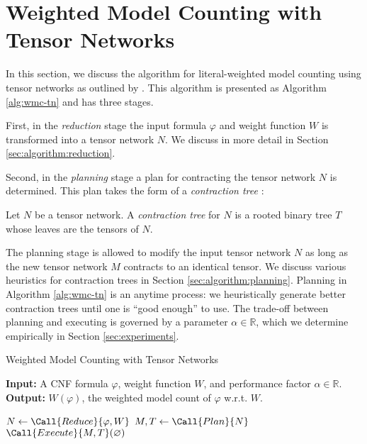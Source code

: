 \section{Weighted Model Counting with Tensor Networks}
\label{sec:algorithm}
In this section, we discuss the algorithm for literal-weighted model counting using tensor networks as outlined by \cite{DDV19}. This algorithm is presented as Algorithm \ref{alg:wmc-tn} and has three stages.

First, in the \emph{reduction} stage the input formula $\varphi$ and weight function $W$ is transformed into a tensor network $N$. We discuss in more detail in Section \ref{sec:algorithm:reduction}.

Second, in the \emph{planning} stage a plan for contracting the tensor network $N$ is determined. This plan takes the form of a \emph{contraction tree} \cite{EP14}:
\begin{definition} \label{def:contraction-tree}
	Let $N$ be a tensor network. A \emph{contraction tree} for $N$ is a rooted binary tree $T$ whose leaves are the tensors of $N$. %
\end{definition}
The planning stage is allowed to modify the input tensor network $N$ as long as the new tensor network $M$ contracts to an identical tensor. We discuss various heuristics for contraction trees in Section \ref{sec:algorithm:planning}.
Planning in Algorithm \ref{alg:wmc-tn} is an anytime process: we heuristically generate better contraction trees until one is ``good enough'' to use. The trade-off between planning and executing is governed by a parameter $\alpha \in \mathbb{R}$, which we determine empirically in Section \ref{sec:experiments}. 

\begin{algorithm}[t]
	\caption{Weighted Model Counting with Tensor Networks}\label{alg:wmc-tn}
	\hspace*{\algorithmicindent} \textbf{Input:} A CNF formula $\varphi$, weight function $W$, and performance factor $\alpha \in \mathbb{R}$. \\
	\hspace*{\algorithmicindent} \textbf{Output:} $W(\varphi)$, the weighted model count of $\varphi$ w.r.t. $W$.
	\begin{algorithmic}[1]
	    \State $N \gets \Call{Reduce}{\varphi, W}$
	    \Repeat
	    \State $M, T \gets \Call{Plan}{N}$
	    \State \Return $\Call{Execute}{M, T}(\emptyset)$
	\end{algorithmic}
\end{algorithm}


